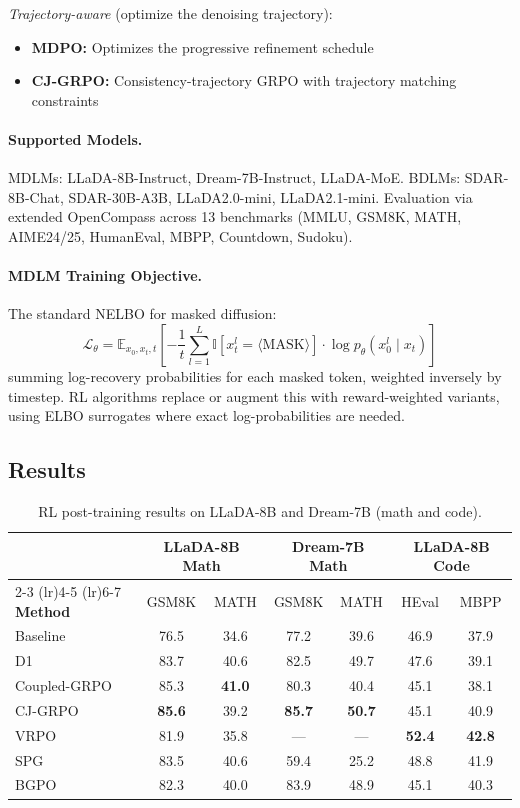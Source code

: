 \documentclass[11pt]{article}
\begin{document}
\textit{Trajectory-aware} (optimize the denoising trajectory):
\begin{itemize}
    \item \textbf{MDPO:} Optimizes the progressive refinement schedule
    \item \textbf{CJ-GRPO:} Consistency-trajectory GRPO with trajectory matching constraints
\end{itemize}

\paragraph{Supported Models.}
MDLMs: LLaDA-8B-Instruct, Dream-7B-Instruct, LLaDA-MoE. BDLMs: SDAR-8B-Chat, SDAR-30B-A3B, LLaDA2.0-mini, LLaDA2.1-mini. Evaluation via extended OpenCompass across 13 benchmarks (MMLU, GSM8K, MATH, AIME24/25, HumanEval, MBPP, Countdown, Sudoku).

\paragraph{MDLM Training Objective.}
The standard NELBO for masked diffusion:
\begin{equation}
    \mathcal{L}_\theta = \mathbb{E}_{x_0, x_t, t}\!\left[-\frac{1}{t} \sum_{l=1}^{L} \mathbb{I}[x_t^l = \langle\mathrm{MASK}\rangle] \cdot \log p_\theta(x_0^l \mid x_t)\right]
\end{equation}
summing log-recovery probabilities for each masked token, weighted inversely by timestep. RL algorithms replace or augment this with reward-weighted variants, using ELBO surrogates where exact log-probabilities are needed.

\subsection{Results}

\begin{table}[h]
\centering
\caption{RL post-training results on LLaDA-8B and Dream-7B (math and code).}
\begin{tabular}{lcccccc}
\toprule
 & \multicolumn{2}{c}{\textbf{LLaDA-8B Math}} & \multicolumn{2}{c}{\textbf{Dream-7B Math}} & \multicolumn{2}{c}{\textbf{LLaDA-8B Code}} \\
\cmidrule(lr){2-3} \cmidrule(lr){4-5} \cmidrule(lr){6-7}
\textbf{Method} & GSM8K & MATH & GSM8K & MATH & HEval & MBPP \\
\midrule
Baseline & 76.5 & 34.6 & 77.2 & 39.6 & 46.9 & 37.9 \\
D1 & 83.7 & 40.6 & 82.5 & 49.7 & 47.6 & 39.1 \\
Coupled-GRPO & 85.3 & \textbf{41.0} & 80.3 & 40.4 & 45.1 & 38.1 \\
CJ-GRPO & \textbf{85.6} & 39.2 & \textbf{85.7} & \textbf{50.7} & 45.1 & 40.9 \\
VRPO & 81.9 & 35.8 & --- & --- & \textbf{52.4} & \textbf{42.8} \\
SPG & 83.5 & 40.6 & 59.4 & 25.2 & 48.8 & 41.9 \\
BGPO & 82.3 & 40.0 & 83.9 & 48.9 & 45.1 & 40.3 \\
\bottomrule
\end{tabular}
\end{table}
\end{document}
